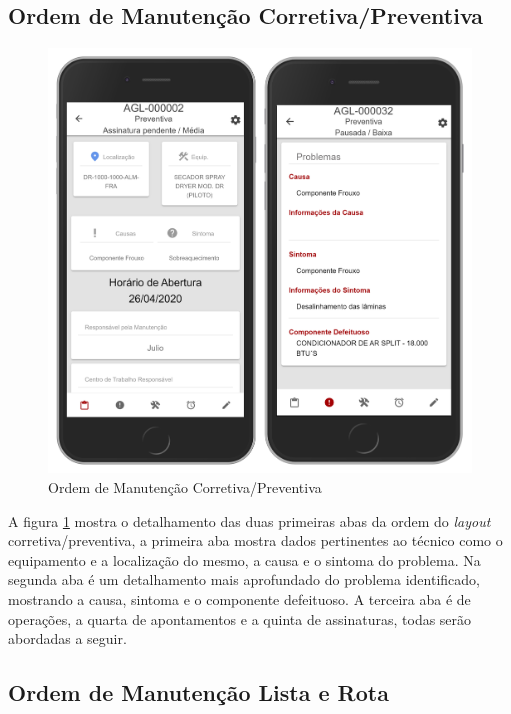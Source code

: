 \subsection{Ordem de Manutenção Corretiva/Preventiva}

\begin{figure}[H]
	\caption{\label{mobile-om-preventiva}Ordem de Manutenção Corretiva/Preventiva}
	\begin{center}
		\includegraphics[scale=0.55]{./Figuras/agil.it/mobile-om-preventiva.jpg}
	\end{center}
\end{figure}

A figura \ref{mobile-om-preventiva} mostra o detalhamento das duas primeiras abas da ordem do \textit{layout} corretiva/preventiva, a primeira aba mostra dados pertinentes ao técnico como o equipamento e a localização do mesmo, a causa e o sintoma do problema. Na segunda aba é um detalhamento mais aprofundado do problema identificado, mostrando a causa, sintoma e o componente defeituoso. A terceira aba é de operações, a quarta de apontamentos e a quinta de assinaturas, todas serão abordadas a seguir.

\subsection{Ordem de Manutenção Lista e Rota}

